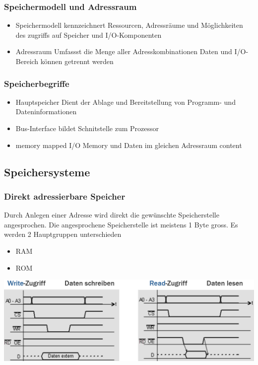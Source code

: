 \subsubsection{Speichermodell und Adressraum}
\begin{itemize}
    \item Speichermodell
    \subitem kennzeichnert Ressourcen, Adressräume und Möglichkeiten des zugriffs auf Speicher und I/O-Komponenten
    \item Adressraum
    \subitem Umfassst die Menge aller Adresskombinationen
    \subitem Daten und I/O-Bereich können getrennt werden
\end{itemize}

\subsubsection{Speicherbegriffe}
\begin{itemize}
    \item Hauptspeicher
    \subitem Dient der Ablage und Bereitstellung von Programm- und Dateninformationen
    \item Bus-Interface
    \subitem bildet Schnitstelle zum Prozessor
    \item memory mapped I/O
    \subitem Memory und Daten im gleichen Adressraum
    content
\end{itemize}

\subsection{Speichersysteme}
\subsubsection{Direkt adressierbare Speicher}
\begin{minipage}{0.5\linewidth}
    Durch Anlegen einer Adresse wird direkt die gewünschte Speicherstelle angesprochen.
    Die angesprochene Speicherstelle ist meistens 1 Byte gross.\newline
    Es werden 2 Hauptgruppen unterschieden
    \begin{itemize}
        \item RAM
        \item ROM
    \end{itemize}
\end{minipage}
\begin{minipage}{0.5\linewidth}
    \includegraphics[width=\textwidth]{images/SystembusSpeicherSpeichersystem/SpeicherSysDirectMem}
\end{minipage}\newline

